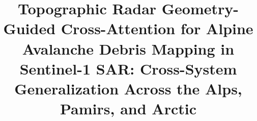 \documentclass[pdflatex,sn-basic,iicol]{sn-jnl}
\begin{document}
\title[TopoRadar-Net for Alpine Avalanche Debris Mapping in Sentinel-1 SAR]{Topographic Radar Geometry-Guided Cross-Attention for Alpine Avalanche Debris Mapping in Sentinel-1 SAR: Cross-System Generalization Across the Alps, Pamirs, and Arctic}

\author[1]{\fnm{}\sur{}}

\abstract{

}


\maketitle










\end{document}
